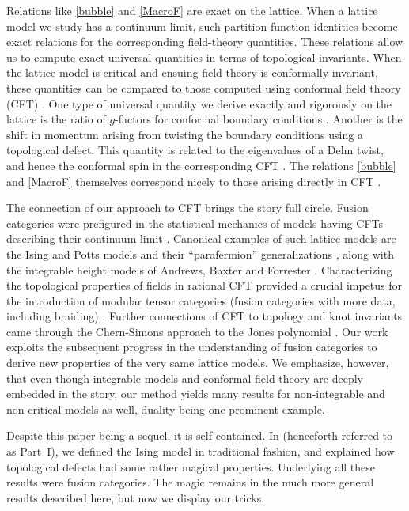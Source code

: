 Relations like \eqref{bubble} and \eqref{MacroF} are exact on the lattice. When a lattice model we study has a continuum limit, such partition function identities become exact relations for the corresponding field-theory quantities. These relations allow us to compute exact universal quantities in terms of topological invariants. When the lattice model is critical and ensuing field theory is conformally invariant, these quantities can be compared to those computed using  conformal field theory (CFT) \cite{BPZ:CFT:84}. One type of universal quantity we derive exactly and rigorously on the lattice is the ratio of $g$-factors for conformal boundary conditions \cite{Cardy1989,AffleckLudwig}. Another is the shift in momentum arising from twisting the boundary conditions using a topological defect. This quantity is related to the eigenvalues of a Dehn twist, and hence the conformal spin in the corresponding CFT \cite{Cardy1986}. The relations \eqref{bubble} and \eqref{MacroF} themselves correspond nicely to those arising directly in CFT \cite{Petkova2001,Frohlich:2006,Frohlich2009}. 

The connection of our approach to CFT brings the story full circle. Fusion categories were prefigured in the statistical mechanics of models having CFTs describing their continuum limit \cite{Temperley1971,Fortuin1971,Baxter1976}.  
Canonical examples of such lattice models are the Ising and Potts models  \cite{Baxter1982,Wu1992} and their ``parafermion'' generalizations \cite{Fradkin1980,Fateev82}, along with the integrable height models of Andrews, Baxter and Forrester \cite{Andrews1984}.  Characterizing the topological properties of fields in rational CFT provided a crucial impetus for the introduction of modular tensor categories (fusion categories with more data, including braiding)  \cite{MSReview89}. Further connections of CFT to topology and knot invariants came through the Chern-Simons approach to the Jones polynomial \cite{Witten:1989}. Our work exploits the subsequent progress in the understanding of fusion categories to derive new properties of the very same lattice models.  
We emphasize, however, that even though integrable models and conformal field theory are deeply embedded in the story, our method yields many results for non-integrable and non-critical models as well, duality being one prominent example. 


Despite this paper being a sequel, it is self-contained. In \cite{Aasen2016} (henceforth referred to as Part~I), we defined the Ising model in traditional fashion, and explained how topological defects had some rather magical properties. Underlying all these results were fusion categories. The magic remains in the much more general results described here, but now we display our tricks.

